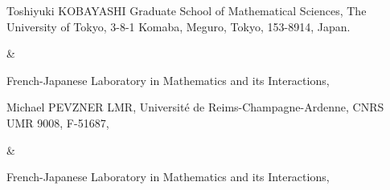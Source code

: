 \documentclass[12pt]{amsart}
\theoremstyle{plain} %
\theoremstyle{definition} %
\theoremstyle{remark} %
\begin{document}
\vskip15pt
\footnotesize{
\leftline
{Toshiyuki KOBAYASHI}
\leftline
{Graduate School of Mathematical Sciences, }
\leftline
{The University of Tokyo,
 3-8-1 Komaba, Meguro, 
Tokyo, 153-8914, Japan.} 

\&

\leftline
{French-Japanese Laboratory
 in Mathematics and its Interactions, }


\vskip 1pc
\leftline
{Michael PEVZNER}
\leftline
{LMR, 
Universit{\'e} de Reims-Champagne-Ardenne, 
CNRS UMR 9008, F-51687,}

\&

\leftline
{French-Japanese Laboratory
 in Mathematics and its Interactions, }
}
\end{document}

